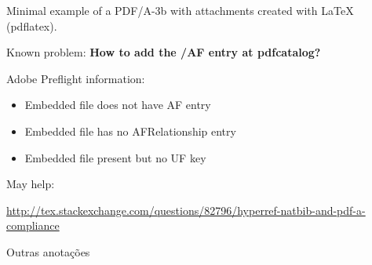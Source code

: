 \documentclass{article}
\begin{document}
Minimal example of a PDF/A-3b with attachments created with LaTeX (pdflatex).

Known problem: \textbf{How to add the /AF entry at pdfcatalog?}

Adobe Preflight information:
\begin{itemize}
  \item Embedded file does not have AF entry
  \item Embedded file has no AFRelationship entry 
  \item Embedded file present but no UF key
\end{itemize}


May help:

\url{http://tex.stackexchange.com/questions/82796/hyperref-natbib-and-pdf-a-compliance}


Outras anotações

%
%
%
% 
%
\end{document}
